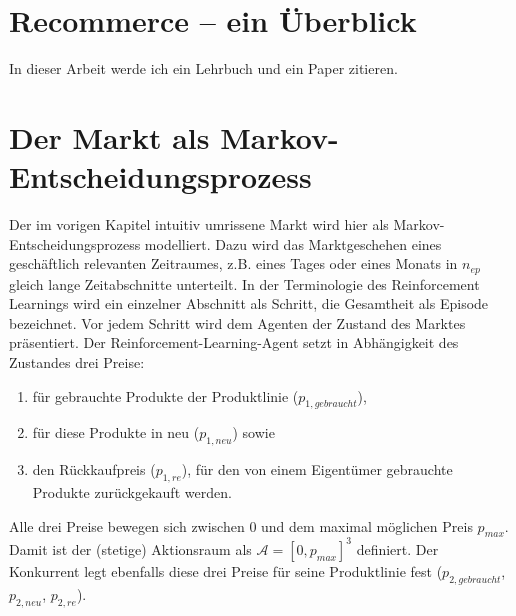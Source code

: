 \section{Recommerce -- ein Überblick}
In dieser Arbeit werde ich ein Lehrbuch \cite{Sutton1998} und ein Paper \cite{DBLP:journals/corr/abs-1712-01815} zitieren.

\section{Der Markt als Markov-Entscheidungsprozess}
Der im vorigen Kapitel intuitiv umrissene Markt wird hier als Markov-Entscheidungsprozess modelliert.
Dazu wird das Marktgeschehen eines geschäftlich relevanten Zeitraumes, z.B. eines Tages oder eines Monats in $n_{ep}$ gleich lange Zeitabschnitte unterteilt.
In der Terminologie des Reinforcement Learnings wird ein einzelner Abschnitt als Schritt, die Gesamtheit als Episode bezeichnet.
Vor jedem Schritt wird dem Agenten der Zustand des Marktes präsentiert.
Der Reinforcement-Learning-Agent setzt in Abhängigkeit des Zustandes drei Preise:
\begin{enumerate}
    \item für gebrauchte Produkte der Produktlinie ($p_{1, gebraucht}$),
    \item für diese Produkte in neu ($p_{1, neu}$) sowie
    \item den Rückkaufpreis ($p_{1, re}$), für den von einem Eigentümer gebrauchte Produkte zurückgekauft werden.
\end{enumerate}
Alle drei Preise bewegen sich zwischen 0 und dem maximal möglichen Preis $p_{max}$.
Damit ist der (stetige) Aktionsraum als $\mathcal{A}=[0, p_{max}]^3$ definiert.
Der Konkurrent legt ebenfalls diese drei Preise für seine Produktlinie fest ($p_{2, gebraucht}$, $p_{2, neu}$, $p_{2, re}$).

